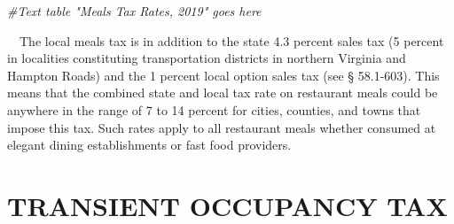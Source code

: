 \documentclass[
]{book}
\newenvironment{Shaded}{\begin{snugshade}}{\end{snugshade}}
\newcommand{\CommentTok}[1]{\textcolor[rgb]{0.56,0.35,0.01}{\textit{#1}}}
\begin{document}
\begin{Shaded}
\begin{Highlighting}[]
\CommentTok{\#Text table "Meals Tax Rates, 2019" goes here}
\end{Highlighting}
\end{Shaded}

\hfill\break
~~The local meals tax is in addition to the state 4.3 percent sales tax (5 percent in localities constituting transportation districts in northern Virginia and Hampton Roads) and the 1 percent local option sales tax (see § 58.1-603). This means that the combined state and local tax rate on restaurant meals could be anywhere in the range of 7 to 14 percent for cities, counties, and towns that impose this tax. Such rates apply to all restaurant meals whether consumed at elegant dining establishments or fast food providers.\\

\hypertarget{transient-occupancy-tax}{%
\section{TRANSIENT OCCUPANCY TAX}\label{transient-occupancy-tax}}
\end{document}
